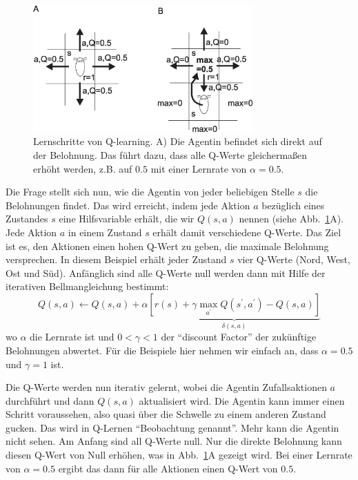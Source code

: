 \documentclass[12pt]{article}
\begin{document}
\begin{figure}[!hbt]
\begin{center}
\mbox{\includegraphics[width=0.75\textwidth]{learning_steps}}
\end{center}
\caption{Lernschritte von Q-learning. A) Die Agentin befindet
  sich direkt auf der Belohnung. Das führt dazu, dass alle
  Q-Werte gleichermaßen erhöht werden, z.B. auf $0.5$ mit
  einer Lernrate von $\alpha = 0.5$.
\label{learning_steps}}
\end{figure}

Die Frage stellt sich nun, wie die Agentin von jeder beliebigen Stelle
$s$ die Belohnungen findet. Das wird erreicht, indem jede Aktion $a$
bezüglich eines Zustandes $s$ eine Hilfsvariable erhält, die wir
$Q(s,a)$ nennen (siehe Abb.~\ref{learning_steps}A). Jede Aktion $a$ in einem
Zustand $s$ erhält damit verschiedene Q-Werte. Das Ziel ist es, den Aktionen
einen hohen Q-Wert zu geben, die maximale Belohnung versprechen. In diesem
Beispiel erhält jeder Zustand $s$ vier Q-Werte (Nord, West, Ost
und Süd). Anfänglich sind alle Q-Werte null werden dann mit Hilfe der iterativen Bellmangleichung bestimmt:
\begin{equation}
  Q(s,a) \leftarrow Q(s,a) + \alpha \underbrace{\left[ r(s) + \gamma \max_{a^\prime} Q(s^\prime,a^\prime) - Q(s,a) \right]}_{\delta(s,a)}
  \label{bellit}
\end{equation}
wo $\alpha$ die Lernrate ist und $0 < \gamma < 1$ der ``discount
Factor'' der zukünftige Belohnungen abwertet. Für die Beispiele hier
nehmen wir einfach an, dass $\alpha = 0.5$ und $\gamma = 1$ ist.

Die Q-Werte werden nun iterativ gelernt, wobei die Agentin
Zufallsaktionen $a$ durchführt und dann $Q(s,a)$ aktualisiert
wird. Die Agentin kann immer einen Schritt voraussehen, also quasi
über die Schwelle zu einem anderen Zustand gucken. Das wird in Q-Lernen
``Beobachtung genannt''. Mehr kann die Agentin nicht sehen. Am Anfang
sind all Q-Werte null. Nur die direkte Belohnung kann diesen Q-Wert von Null
erhöhen, was in Abb.~\ref{learning_steps}A gezeigt wird. Bei einer
Lernrate von $\alpha = 0.5$ ergibt das dann für alle Aktionen einen
Q-Wert von $0.5$.
\end{document}
